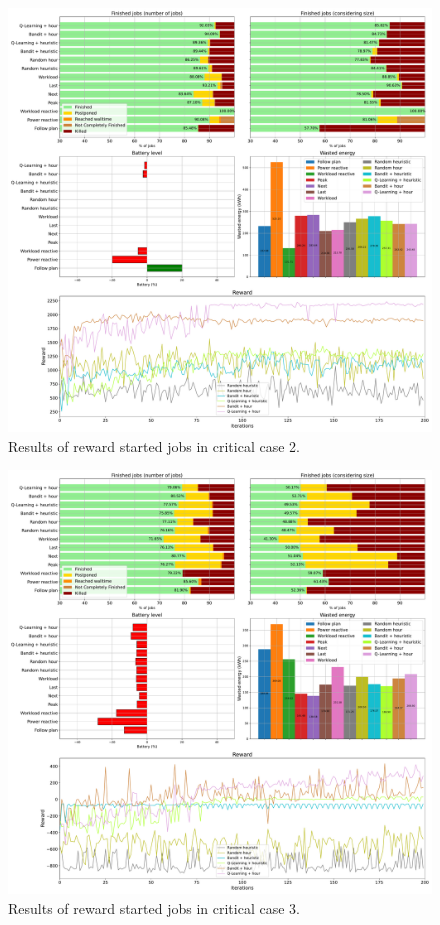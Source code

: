 \begin{figure}[!htb]
    \centering
    \includegraphics[scale=0.29]{Images/Learning_compensations/reward_started_profile_best_workload_2_with_noise_state_delta.pdf}
    \caption{Results of reward started jobs in critical case 2.}
    \label{fig:started_reward_results_critical_2}
\end{figure}

\begin{figure}[!htb]
    \centering
    \includegraphics[scale=0.29]{Images/Learning_compensations/reward_started_profile_worst_workload_1_with_noise_state_delta.pdf}
    \caption{Results of reward started jobs in critical case 3.}
    \label{fig:started_reward_results_critical_3}
\end{figure}

